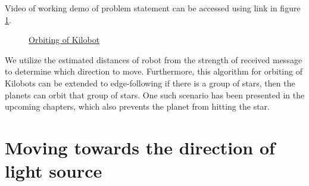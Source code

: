 Video of working demo of problem statement can be accessed using link in figure \ref{fig:orbit}.
\begin{figure}[H]
	\centering
	\caption{\href{https://photos.app.goo.gl/xPYoywncwhCk585X8}{Orbiting of Kilobot}}
	\label{fig:orbit}
\end{figure}
We utilize the estimated distances of robot from the strength of received message to determine which direction to move. Furthermore, this algorithm for orbiting of Kilobots can be extended to edge-following if there is a group of stars, then the planets can orbit that group of stars. One such scenario has been presented in the upcoming chapters, which also prevents the planet from hitting the star. \\

\chapter{Moving towards the direction of light source}
